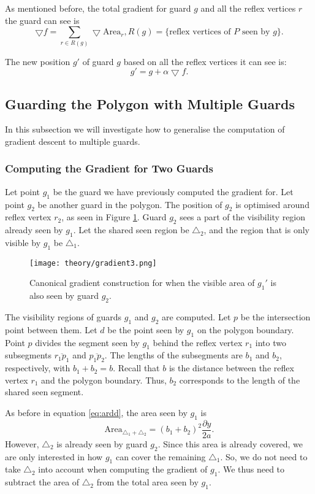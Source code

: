 As mentioned before, the total gradient for guard $g$ and all the reflex vertices $r$ the guard can see is $$\bigtriangledown f = \sum_{r \in R(g)} \bigtriangledown \text{Area}_r, R(g) = \{\text{reflex vertices of } P \text{ seen by }g\}.$$

The new position $g'$ of guard $g$ based on all the reflex vertices it can see is: 
\begin{equation}
    g' = g + \alpha\bigtriangledown f.
    \label{eq:l}
\end{equation}

\newpage
\subsection{Guarding the Polygon with Multiple Guards}
In this subsection we will investigate how to generalise the computation of gradient descent to multiple guards.

\subsubsection{Computing the Gradient for Two Guards}
Let point $g_1$ be the guard we have previously computed the gradient for. Let point $g_2$ be another guard in the polygon. The position of $g_2$ is optimised around reflex vertex $r_2$, as seen in Figure \ref{fig:poly_gradient}. Guard $g_2$ sees a part of the visibility region already seen by $g_1$. Let the shared seen region be $\triangle_2$, and the region that is only visible by $g_1$ be $\triangle_1$.

\begin{figure}[h!]
    \centering
    \texttt{[image: theory/gradient3.png]}
    \caption{Canonical gradient construction for when the visible area of $g_1'$ is also seen by guard $g_2$.}
    \label{fig:poly_gradient}
\end{figure}

The visibility regions of guards $g_1$ and $g_2$ are computed. Let $p$ be the intersection point between them. Let $d$ be the point seen by $g_1$ on the polygon boundary. Point $p$ divides the segment seen by $g_1$ behind the reflex vertex $r_1$ into two subsegments $\overline{r_1p_1}$ and $\overline{p_1p_2}$. The lengths of the subsegments are $b_1$ and $b_2$, respectively, with $b_1 + b_2 = b$. Recall that $b$ is the distance between the reflex vertex $r_1$ and the polygon boundary. Thus,  $b_2$ corresponds to the length of the shared seen segment.

As before in equation \ref{eq:ardd}, the area seen by $g_1$ is $$\text{Area}_{\triangle_1 + \triangle_2} = (b_1 + b_2)^2\frac{\partial y}{2a}.$$
However, $\triangle_2$ is already seen by guard $g_2$. Since this area is already covered, we are only interested in how $g_1$ can cover the remaining $\triangle_1$. So, we do not need to take $\triangle_2$ into account when computing the gradient of $g_1$. We thus need to subtract the area of $\triangle_2$ from the total area seen by $g_1$. 

